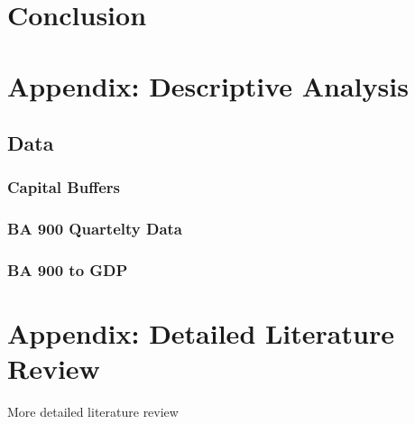 \documentclass[
]{article}
\begin{document}
\hypertarget{conclusion}{%
\section{Conclusion}\label{conclusion}}

\newpage

\hypertarget{appendix-descriptive-analysis}{%
\section{Appendix: Descriptive Analysis}\label{appendix-descriptive-analysis}}

\hypertarget{data}{%
\subsection{Data}\label{data}}

\hypertarget{capital-buffers}{%
\subsubsection{Capital Buffers}\label{capital-buffers}}

\hypertarget{ba-900-quartelty-data}{%
\subsubsection{BA 900 Quartelty Data}\label{ba-900-quartelty-data}}

\hypertarget{ba-900-to-gdp}{%
\subsubsection{BA 900 to GDP}\label{ba-900-to-gdp}}

\newpage

\hypertarget{appendix-detailed-literature-review}{%
\section{Appendix: Detailed Literature Review}\label{appendix-detailed-literature-review}}

More detailed literature review

\newpage

\renewcommand\refname{References}
  
\end{document}
